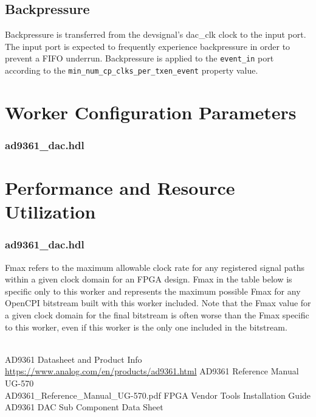 \documentclass{article}
\def\devsignal{devsignal}
\def\comp{ad9361\_dac}
\edef\ecomp{ad9361_adc}
\begin{document}
\subsection*{Backpressure}
Backpressure is transferred from the \devsignal{}'s dac\_clk clock to the input port. The input port is expected to frequently experience backpressure in order to prevent a FIFO underrun. Backpressure is applied to the \verb+event_in+ port according to the \verb+min_num_cp_clks_per_txen_event+ property value.

\section*{Worker Configuration Parameters}
\subsubsection*{\comp.hdl}
%
\section*{Performance and Resource Utilization}
\subsubsection*{\comp.hdl}
Fmax refers to the maximum allowable clock rate for any registered signal paths within a given clock domain for an FPGA design. Fmax in the table below is specific only to this worker and represents the maximum possible Fmax for any OpenCPI bitstream built with this worker included. Note that the Fmax value for a given clock domain for the final bitstream is often worse than the Fmax specific to this worker, even if this worker is the only one included in the bitstream. \\ \\

%



\pagebreak
\begin{thebibliography}{1}

 AD9361 Datasheet and Product Info \\
\url{https://www.analog.com/en/products/ad9361.html}
 AD9361 Reference Manual UG-570\\
AD9361\_Reference\_Manual\_UG-570.pdf
 FPGA Vendor Tools Installation Guide \\
 AD9361 DAC Sub Component Data Sheet \\

\end{thebibliography}
\pagebreak
\end{document}
